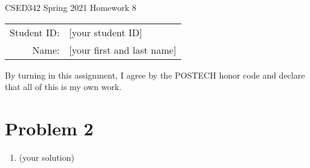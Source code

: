 \documentclass[12pt]{article}
\begin{document}
\begin{center}
{\Large CSED342 Spring 2021 Homework 8 \vspace{10pt}}

\begin{tabular}{rl}
Student ID: & [your student ID] \\
Name: & [your first and last name] \\
\end{tabular}
\end{center}

By turning in this assignment, I agree by the POSTECH honor code and declare that all of this is my own work.

\section*{Problem 2}

\begin{enumerate}[label=(\alph*)]
  \item (your solution)


\end{enumerate}
\end{document}
